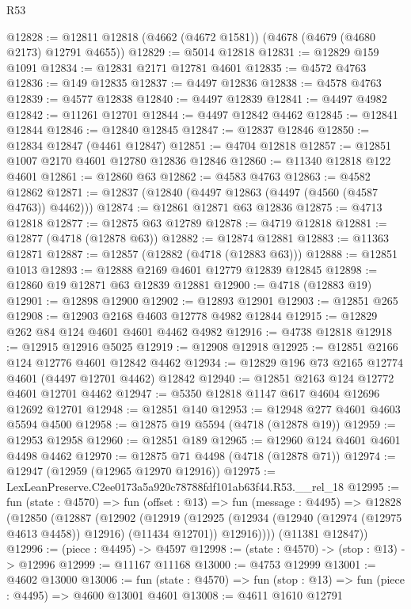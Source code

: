 \begin{lexlean}{R53}
\begin{coremodule}
@12828 := @12811 @12818 (@4662 (@4672 @1581)) (@4678 (@4679 (@4680 @2173) @12791 @4655))
@12829 := @5014 @12818
@12831 := @12829 @159 @1091
@12834 := @12831 @2171 @12781 @4601
@12835 := @4572 @4763
@12836 := @149 @12835
@12837 := @4497 @12836
@12838 := @4578 @4763
@12839 := @4577 @12838
@12840 := @4497 @12839
@12841 := @4497 @4982
@12842 := @11261 @12701
@12844 := @4497 @12842 @4462
@12845 := @12841 @12844
@12846 := @12840 @12845
@12847 := @12837 @12846
@12850 := @12834 @12847 (@4461 @12847)
@12851 := @4704 @12818
@12857 := @12851 @1007 @2170 @4601 @12780 @12836 @12846
@12860 := @11340 @12818 @122 @4601
@12861 := @12860 @63
@12862 := @4583 @4763
@12863 := @4582 @12862
@12871 := @12837 (@12840 (@4497 @12863 (@4497 (@4560 (@4587 @4763)) @4462)))
@12874 := @12861 @12871 @63 @12836
@12875 := @4713 @12818
@12877 := @12875 @63 @12789
@12878 := @4719 @12818
@12881 := @12877 (@4718 (@12878 @63))
@12882 := @12874 @12881
@12883 := @11363 @12871
@12887 := @12857 (@12882 (@4718 (@12883 @63)))
@12888 := @12851 @1013
@12893 := @12888 @2169 @4601 @12779 @12839 @12845
@12898 := @12860 @19 @12871 @63 @12839 @12881
@12900 := @4718 (@12883 @19)
@12901 := @12898 @12900
@12902 := @12893 @12901
@12903 := @12851 @265
@12908 := @12903 @2168 @4603 @12778 @4982 @12844
@12915 := @12829 @262 @84 @124 @4601 @4601 @4462 @4982
@12916 := @4738 @12818
@12918 := @12915 @12916 @5025
@12919 := @12908 @12918
@12925 := @12851 @2166 @124 @12776 @4601 @12842 @4462
@12934 := @12829 @196 @73 @2165 @12774 @4601 (@4497 @12701 @4462) @12842
@12940 := @12851 @2163 @124 @12772 @4601 @12701 @4462
@12947 := @5350 @12818 @1147 @617 @4604 @12696 @12692 @12701
@12948 := @12851 @140
@12953 := @12948 @277 @4601 @4603 @5594 @4500
@12958 := @12875 @19 @5594 (@4718 (@12878 @19))
@12959 := @12953 @12958
@12960 := @12851 @189
@12965 := @12960 @124 @4601 @4601 @4498 @4462
@12970 := @12875 @71 @4498 (@4718 (@12878 @71))
@12974 := @12947 (@12959 (@12965 @12970 @12916))
@12975 := LexLeanPreserve.C2ee0173a5a920c78788fdf101ab63f44.R53.__rel_18
@12995 := fun (state : @4570) =>
  fun (offset : @13) =>
  fun (message : @4495) =>
  @12828
    (@12850
      (@12887
        (@12902
          (@12919
            (@12925
              (@12934 (@12940 (@12974 (@12975 @4613 @4458)) @12916) (@11434 @12701))
              @12916))))
      (@11381 @12847))
@12996 := (piece : @4495) -> @4597
@12998 := (state : @4570) -> (stop : @13) -> @12996
@12999 := @11167 @11168
@13000 := @4753 @12999
@13001 := @4602 @13000
@13006 := fun (state : @4570) => fun (stop : @13) => fun (piece : @4495) => @4600 @13001 @4601
@13008 := @4611 @1610 @12791

\end{coremodule}
\end{lexlean}
